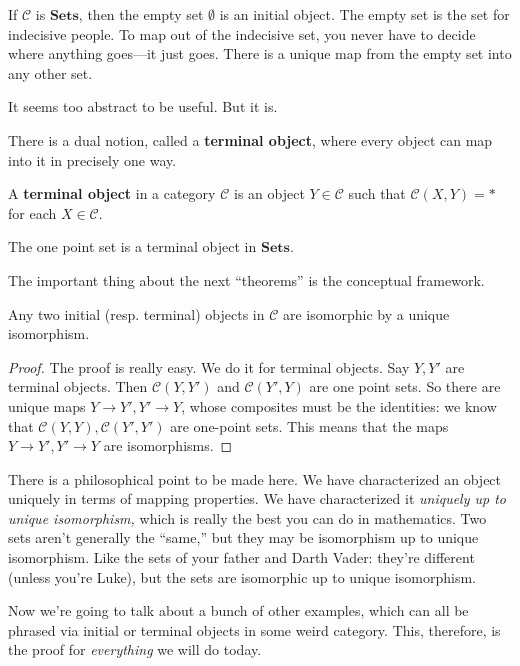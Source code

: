 \begin{example} 
If $\mathcal{C}$ is $\mathbf{Sets}$, then the empty set $\emptyset$ is an
initial object. The empty set is the set for indecisive people. To map out of
the indecisive set, you never have to decide where anything goes---it just
goes. There is a unique map from the empty set into any other set. 
\end{example} 

It seems too abstract to be useful. But it is. 

There is a dual notion, called a \textbf{terminal object}, where every object
can map into it in precisely one way. 
\begin{definition} 
A \textbf{terminal object} in a category $\mathcal{C}$ is an object $Y \in
\mathcal{C}$ such that $\mathcal{C}(X, Y) = \ast$ for each $X \in \mathcal{C}$.
\end{definition} 

\begin{example} 
The one point set is a terminal object in $\mathbf{Sets}$. 
\end{example} 

The important thing about the next ``theorems'' is the conceptual framework.
\begin{theorem} 
Any two initial (resp. terminal) objects in $\mathcal{C}$ are isomorphic by a
unique isomorphism.
\end{theorem} 
\begin{proof} 
The proof is really easy. We do it for terminal objects. Say $Y, Y'$ are
terminal objects. Then $\mathcal{C}(Y, Y')$ and $\mathcal{C}(Y', Y)$ are one
point sets. So there are unique maps $Y \to Y', Y' \to Y$, whose composites
must be the identities: we know that $\mathcal{C}(Y, Y) , \mathcal{C}(Y', Y')$
are one-point sets. This means that the maps $Y \to Y', Y' \to Y$ are
isomorphisms. 
\end{proof} 

There is a philosophical point to be made here. We have characterized an object
uniquely in terms of mapping properties. We have characterized it
\emph{uniquely up to unique isomorphism,} which is really the best you can do
in mathematics. Two sets aren't generally the ``same,'' but they may be
isomorphism up to unique isomorphism. Like the sets of your father and Darth
Vader: they're different (unless you're Luke), but the sets are isomorphic up
to unique isomorphism. 

Now we're going to talk about a bunch of other examples, which can all be
phrased via initial or terminal objects in some weird category. This,
therefore, is the proof for \emph{everything} we will do today.

